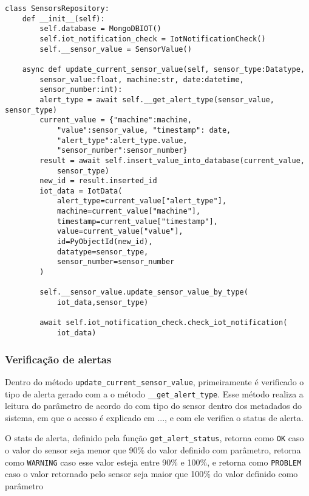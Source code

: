 \begin{verbatim}
class SensorsRepository:
    def __init__(self):
        self.database = MongoDBIOT()
        self.iot_notification_check = IotNotificationCheck()
        self.__sensor_value = SensorValue()

    async def update_current_sensor_value(self, sensor_type:Datatype,
        sensor_value:float, machine:str, date:datetime, 
        sensor_number:int):
        alert_type = await self.__get_alert_type(sensor_value, sensor_type)
        current_value = {"machine":machine,
            "value":sensor_value, "timestamp": date,
            "alert_type":alert_type.value,
            "sensor_number":sensor_number}
        result = await self.insert_value_into_database(current_value, 
            sensor_type)
        new_id = result.inserted_id
        iot_data = IotData(
            alert_type=current_value["alert_type"],
            machine=current_value["machine"],
            timestamp=current_value["timestamp"],
            value=current_value["value"],
            id=PyObjectId(new_id),
            datatype=sensor_type,
            sensor_number=sensor_number
        )
        
        self.__sensor_value.update_sensor_value_by_type(
            iot_data,sensor_type)
        
        await self.iot_notification_check.check_iot_notification(
            iot_data)
\end{verbatim}

\subsubsection{Verificação de alertas}

Dentro do método \texttt{update\_current\_sensor\_value}, primeiramente é verificado o tipo de alerta gerado com a o método  \texttt{\_\_get\_alert\_type}.
Esse método realiza a leitura do parâmetro de acordo do com tipo do sensor dentro dos metadados do sistema, em que o acesso é explicado em ..., e com ele verifica o status de alerta. 

O stats de alerta, definido pela função  \texttt{get\_alert\_status}, retorna como \texttt{OK} caso o valor do sensor seja menor que 90\% do valor definido com parâmetro, retorna como \texttt{WARNING} caso esse valor esteja entre 90\% e 100\%, e retorna como \texttt{PROBLEM} caso o valor retornado pelo sensor seja maior que 100\% do valor definido como parâmetro

